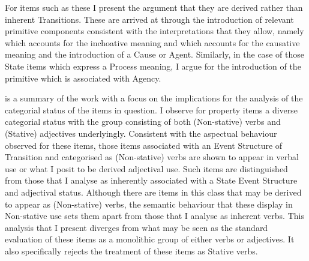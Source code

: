 For items such as these I present the argument that they are derived rather than
inherent Transitions. These are arrived at through the introduction of relevant
primitive components consistent with the interpretations that they allow, namely
\BECOME which accounts for the inchoative meaning and \CAUSE which accounts for
the causative meaning and the introduction of a Cause or Agent. Similarly, in
the case of those State items which express a Process meaning, I argue for the
introduction of the primitive \DO which is associated with Agency.

 is a summary of the work with a focus on the implications for the
analysis of the categorial status of the items in question.  I observe for
property items a diverse categorial status with the group consisting of both
(Non-stative) verbs and (Stative) adjectives underlyingly. Consistent with the
aspectual behaviour observed for these items, those items associated with an
Event Structure of Transition and categorised as (Non-stative) verbs are shown
to appear in verbal use or what I posit to be derived adjectival use. Such items
are distinguished from those that I analyse as inherently associated with a
State Event Structure and adjectival status.  Although there are items in this
class that may be derived to appear as (Non-stative) verbs, the semantic
behaviour that these display in Non-stative use sets them apart from those that
I analyse as inherent verbs. This analysis that I present diverges from what may
be seen as the standard evaluation of these items as a monolithic group of
either verbs or adjectives. It also specifically rejects the treatment of these
items as Stative verbs.
